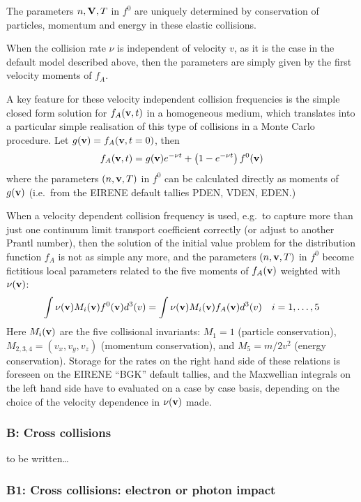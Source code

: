 The parameters $n, \mathbf{V}, T$ in $f^0$ are uniquely determined by conservation of
particles, momentum and energy in these elastic collisions.

When the collision rate $\nu$ is independent of velocity $v$, as it is the case
in the default model described above, then the parameters are simply given by
the first velocity moments of $f_A$.

A key feature for these velocity independent collision frequencies is the
simple closed form solution for $f_A(\mathbf{v},t)$ in a homogeneous medium, which
translates into a particular simple realisation of this type of collisions in a
Monte Carlo procedure.
Let $g(\mathbf{v})=f_A(\mathbf{v},t=0)$, then
\begin{equation}
  f_A(\mathbf{v},t)=g(\mathbf{v})e^{-\nu t}
  +\left(1-e^{-\nu t}\right) f^0(\mathbf{v})
\end{equation}
where the parameters $(n,
  \mathbf{v}, T)$ in $f^0$ can be calculated directly as moments of $g(\mathbf{v})$ (i.e.\ from
the EIRENE default tallies PDEN, VDEN, EDEN.)

When a velocity dependent collision frequency is used, e.g.\ to capture more
than just one continuum limit transport coefficient correctly (or adjust to
another Prantl number), then the solution of the initial value problem for the
distribution function $f_A$ is not as simple any more, and the parameters $(n,
  \mathbf{v}, T)$ in $f^0$ become fictitious local parameters related to the five
moments of $f_A(\mathbf{v})$ weighted with $\nu(\mathbf{v})$:
\begin{equation}
  \int \nu(\mathbf{v}) M_i(\mathbf{v}) f^0(\mathbf{v}) d^3(v) = \int \nu(\mathbf{v}) M_i(\mathbf{v}) f_A(\mathbf{v})
  d^3(v) \ \ \ i=1, \dots, 5
\end{equation}
Here $M_i(\mathbf{v})$ are the five collisional invariants: $M_1 = 1$ (particle
conservation), $M_{2,3,4} = (v_x,v_y,v_z)$ (momentum conservation), and $M_5 =
  m/2 v^2$ (energy conservation).
Storage for the rates on the right hand side of these relations is foreseen on
the EIRENE ``BGK'' default tallies, and the Maxwellian integrals on the left
hand side have to evaluated on a case by case basis, depending on the choice of
the velocity dependence in $\nu(\mathbf{v})$ made.

\subsubsection{B: Cross collisions}

to be written\dots

\subsubsection{B1: Cross collisions: electron or photon impact}

